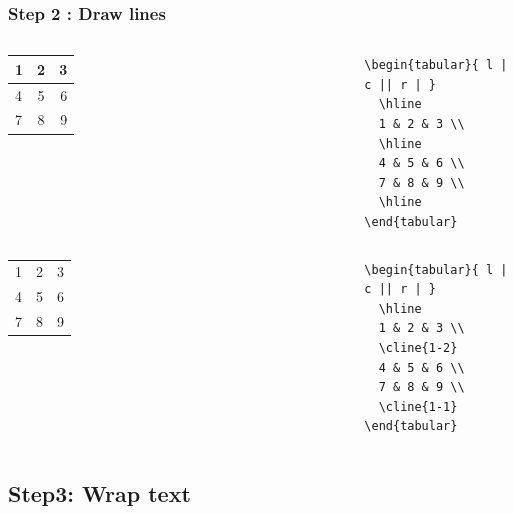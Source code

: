 \documentclass[article]{beamer}
\begin{document}
\begin{frame}[fragile]
\frametitle{Step 2 : Draw lines }

\begin{columns}
\tiny{
  \begin{tabular}{ l | c || r | }
    \hline
    1 & 2 & 3 \\ 
    \hline
    4 & 5 & 6 \\ 
    7 & 8 & 9 \\
    \hline
  \end{tabular}
}	

\tiny{
	\begin{verbatim}
\begin{tabular}{ l | c || r | }
  \hline
  1 & 2 & 3 \\ 
  \hline
  4 & 5 & 6 \\ 
  7 & 8 & 9 \\
  \hline
\end{tabular}
  \end{verbatim}
}
\end{columns}

\begin{columns}
\tiny{
  \begin{tabular}{ l | c || r | }
    \hline
    1 & 2 & 3 \\ 
    \cline{1-2}
    4 & 5 & 6 \\ 
    7 & 8 & 9 \\
    \cline{1-1}
  \end{tabular}
}	

\tiny{
	\begin{verbatim}
\begin{tabular}{ l | c || r | }
  \hline
  1 & 2 & 3 \\ 
  \cline{1-2}
  4 & 5 & 6 \\ 
  7 & 8 & 9 \\
  \cline{1-1}
\end{tabular}
\end{verbatim}
}
\end{columns}

\end{frame}

\subsection{Step3: Wrap text}
\end{document}
